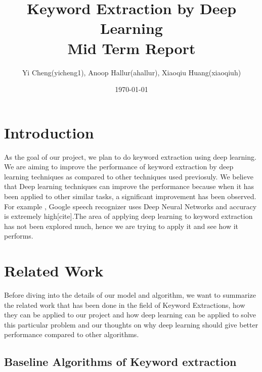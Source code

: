 \documentclass[dvips,12pt]{article}
\begin{document}
	
	
	\title{Keyword Extraction by Deep Learning \\Mid Term Report}
	\author{Yi Cheng(yicheng1), Anoop Hallur(ahallur), Xiaoqiu Huang(xiaoqiuh)}
	\date{\today}
	
	
	\maketitle
	
	
	\section{Introduction}
	
		As the goal of our project, we plan to do keyword extraction using deep learning. We are aiming to improve the performance of keyword extraction by deep learning techniques as compared to other techniques used previosuly.
		We believe that Deep learning techniques can improve the performance because when it has been applied to other similar tasks, a significant improvement has been observed.
		For example , Google speech recognizer uses Deep Neural Networks and accuracy is extremely high[cite].The area of applying deep learning to keyword extraction has not been explored much, hence we are trying to apply it and see how it performs.
	\section{Related Work}
	
		Before diving into the details of our model and algorithm, we want to summarize the related work that has been done in the field of Keyword Extractions, how they can be applied to our project and how deep learning can be applied to solve this particular problem and our thoughts on why deep learning should give better performance compared to other algorithms.
		
		\subsection{Baseline Algorithms of Keyword extraction}
		
\end{document}

